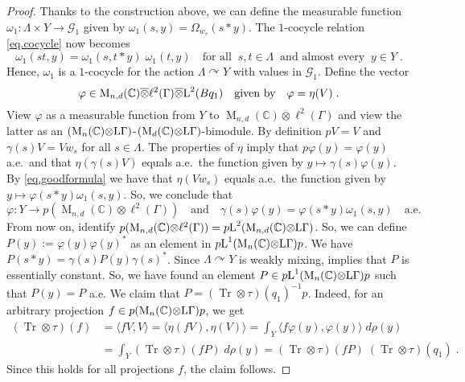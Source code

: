 \documentclass[a4paper,11pt]{amsart}
\numberwithin{equation}{section}
\begin{document}
\begin{proof}
Thanks to the construction above, we can define the measurable function $\omega_1 : \Lambda \times Y {\rightarrow} {\mathcal{G}}_1$ given by $\omega_1(s,y) = \Omega_{w_s}(s * y)$. The $1$-cocycle relation \eqref{eq.cocycle} now becomes
$$\omega_1(st,y) = \omega_1(s,t * y) \; \omega_1(t,y) \quad\text{for all}\;\; s,t \in \Lambda \;\;\text{and almost every}\;\; y \in Y \; .$$
Hence, $\omega_1$ is a $1$-cocycle for the action $\Lambda {\curvearrowright} Y$ with values in ${\mathcal{G}}_1$. Define the vector
$${\varphi} \in {\operatorname{M}}_{n,d}({\mathbb{C}}) {\mathbin{\overline{\otimes}}} \ell^2(\Gamma) {\mathbin{\overline{\otimes}}} {\mathord{\text{\rm L}}}^2(Bq_1) \quad\text{given by}\quad {\varphi} = \eta(V) \; .$$
View ${\varphi}$ as a measurable function from $Y$ to ${\operatorname{M}}_{n,d}({\mathbb{C}}) {\otimes} \ell^2(\Gamma)$ and view the latter as an $({\operatorname{M}}_n({\mathbb{C}}) {\otimes} {\mathord{\text{\rm L}}}\Gamma)$-$({\operatorname{M}}_d({\mathbb{C}}) {\otimes} {\mathord{\text{\rm L}}} \Gamma)$-bimodule. By definition $p V = V$ and $\gamma(s) V = V w_s$ for all $s \in \Lambda$. The properties of $\eta$ imply that $p {\varphi}(y) = {\varphi}(y)$ a.e.\ and that $\eta(\gamma(s) V)$ equals a.e.\ the function given by $y \mapsto \gamma(s) {\varphi}(y)$. By \eqref{eq.goodformula} we have that $\eta(V w_s)$ equals a.e.\ the function given by $y \mapsto {\varphi}(s * y) \omega_1(s,y)$. So, we conclude that
$${\varphi} : Y {\rightarrow} p({\operatorname{M}}_{n,d}({\mathbb{C}}) {\otimes} \ell^2(\Gamma)) \quad\text{and}\quad \gamma(s) {\varphi}(y) = {\varphi}(s * y) \omega_1(s,y) \quad\text{a.e.}$$
From now on, identify $p({\operatorname{M}}_{n,d}({\mathbb{C}}) {\otimes} \ell^2(\Gamma)) = p {\mathord{\text{\rm L}}}^2({\operatorname{M}}_{n,d}({\mathbb{C}}) {\otimes} {\mathord{\text{\rm L}}} \Gamma)$. So, we can define $P(y) := {\varphi}(y) {\varphi}(y)^*$ as an element in $p {\mathord{\text{\rm L}}}^1({\operatorname{M}}_n({\mathbb{C}}) {\otimes} {\mathord{\text{\rm L}}} \Gamma) p$. We have $P(s * y) = \gamma(s) P(y) \gamma(s)^*$. Since $\Lambda {\curvearrowright} Y$ is weakly mixing, \cite[Lemma 5.4]{PV08} implies that $P$ is essentially constant. So, we have found an element $P \in p {\mathord{\text{\rm L}}}^1({\operatorname{M}}_n({\mathbb{C}}) {\otimes} {\mathord{\text{\rm L}}} \Gamma) p$ such that $P(y) = P$ a.e. We claim that $P = ({\operatorname{Tr}} {\otimes} \tau)(q_1)^{-1} p$. Indeed, for an arbitrary projection $f \in p({\operatorname{M}}_n({\mathbb{C}}) {\otimes} {\mathord{\text{\rm L}}} \Gamma)p$, we get
\begin{align*}
({\operatorname{Tr}} {\otimes} \tau)(f) &= \langle f V, V \rangle = \langle \eta(f V),\eta(V) \rangle = \int_Y \langle f {\varphi}(y),{\varphi}(y) \rangle \; d \rho(y) \\
& = \int_Y ({\operatorname{Tr}} {\otimes} \tau)(f P) \; d\rho(y) = ({\operatorname{Tr}} {\otimes} \tau)(fP) \; ({\operatorname{Tr}} {\otimes} \tau)(q_1) \; .
\end{align*}
Since this holds for all projections $f$, the claim follows.


\end{proof}
\end{document}
